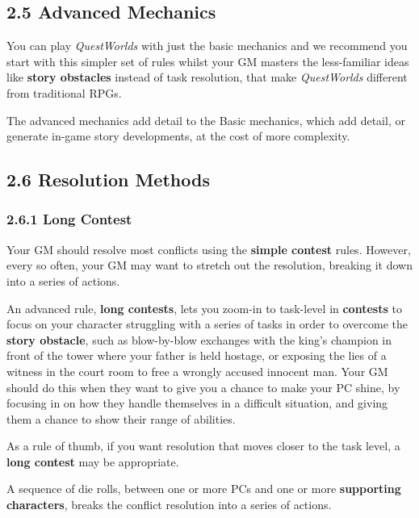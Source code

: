 \documentclass[
]{article}
\begin{document}
\hypertarget{advanced-mechanics}{%
\subsection{2.5 Advanced Mechanics}\label{advanced-mechanics}}

You can play \emph{QuestWorlds} with just the basic mechanics and we
recommend you start with this simpler set of rules whilst your GM
masters the less-familiar ideas like \textbf{story obstacles} instead of
task resolution, that make \emph{QuestWorlds} different from traditional
RPGs.

The advanced mechanics add detail to the Basic mechanics, which add
detail, or generate in-game story developments, at the cost of more
complexity.

\hypertarget{resolution-methods-1}{%
\subsection{2.6 Resolution Methods}\label{resolution-methods-1}}

\hypertarget{long-contest}{%
\subsubsection{2.6.1 Long Contest}\label{long-contest}}

Your GM should resolve most conflicts using the \textbf{simple contest}
rules. However, every so often, your GM may want to stretch out the
resolution, breaking it down into a series of actions.

An advanced rule, \textbf{long contests}, lets you zoom-in to task-level
in \textbf{contests} to focus on your character struggling with a series
of tasks in order to overcome the \textbf{story obstacle}, such as
blow-by-blow exchanges with the king's champion in front of the tower
where your father is held hostage, or exposing the lies of a witness in
the court room to free a wrongly accused innocent man. Your GM should do
this when they want to give you a chance to make your PC shine, by
focusing in on how they handle themselves in a difficult situation, and
giving them a chance to show their range of abilities.

As a rule of thumb, if you want resolution that moves closer to the task
level, a \textbf{long contest} may be appropriate.

A sequence of die rolls, between one or more PCs and one or more
\textbf{supporting characters}, breaks the conflict resolution into a
series of actions.
\end{document}
